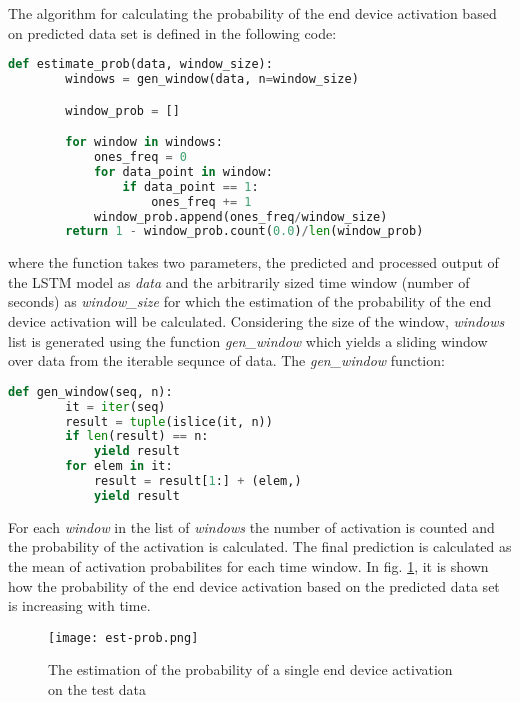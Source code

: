 The algorithm for calculating the probability of the end device activation based on predicted data set is defined in the following code:
\begin{lstlisting}[language=Python]
    def estimate_prob(data, window_size):
        windows = gen_window(data, n=window_size)

        window_prob = []

        for window in windows:
            ones_freq = 0
            for data_point in window:
                if data_point == 1:
                    ones_freq += 1
            window_prob.append(ones_freq/window_size)
        return 1 - window_prob.count(0.0)/len(window_prob)
\end{lstlisting}
where the function takes two parameters, the predicted and processed output of the LSTM model as \textit{data} and the arbitrarily sized time window (number of seconds) as \textit{window\_size} for which the estimation of the probability of the end device activation will be calculated.
Considering the size of the window, \textit{windows} list is generated using the function \textit{gen\_window} which yields a sliding window over data from the iterable sequnce of data. 
The \textit{gen\_window} function:
\begin{lstlisting}[language=Python]
    def gen_window(seq, n):
        it = iter(seq)
        result = tuple(islice(it, n))
        if len(result) == n:
            yield result
        for elem in it:
            result = result[1:] + (elem,)
            yield result
\end{lstlisting}
For each \textit{window} in the list of \textit{windows} the number of activation is counted and the probability of the activation is calculated.
The final prediction is calculated as the mean of activation probabilites for each time window.
In fig. \ref{fig:prob}, it is shown how the probability of the end device activation based on the predicted data set is increasing with time.
\begin{figure}[h]
    \centering
    \texttt{[image: est-prob.png]}
    \caption{The estimation of the probability of a single end device activation on the test data}
    \label{fig:prob}
\end{figure}